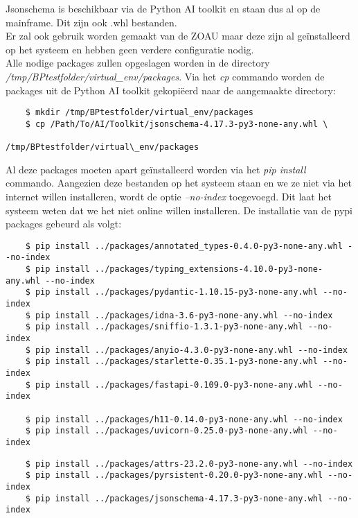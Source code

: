 Jsonschema is beschikbaar via de Python AI toolkit en staan dus al op de mainframe. Dit zijn ook .whl bestanden. \\

Er zal ook gebruik worden gemaakt van de ZOAU maar deze zijn al geïnstalleerd op het systeem en hebben geen verdere configuratie nodig. \\

Alle nodige packages zullen opgeslagen worden in de directory \textit{/tmp/BPtestfolder/virtual\_env/packages}. Via het \textit{cp} commando worden de packages uit de Python AI toolkit gekopiëerd naar de aangemaakte directory: \\

\begin{lstlisting}
    $ mkdir /tmp/BPtestfolder/virtual_env/packages
    $ cp /Path/To/AI/Toolkit/jsonschema-4.17.3-py3-none-any.whl \
                                         /tmp/BPtestfolder/virtual\_env/packages
\end{lstlisting} 

Al deze packages moeten apart geïnstalleerd worden via het \textit{pip install} commando. Aangezien deze bestanden op het systeem staan en we ze niet via het internet willen installeren, wordt de optie \textit{--no-index} toegevoegd. Dit laat het systeem weten dat we het niet online willen installeren. De installatie van de pypi packages gebeurd als volgt:\\
\begin{lstlisting}
    $ pip install ../packages/annotated_types-0.4.0-py3-none-any.whl --no-index
    $ pip install ../packages/typing_extensions-4.10.0-py3-none-any.whl --no-index
    $ pip install ../packages/pydantic-1.10.15-py3-none-any.whl --no-index
    $ pip install ../packages/idna-3.6-py3-none-any.whl --no-index
    $ pip install ../packages/sniffio-1.3.1-py3-none-any.whl --no-index
    $ pip install ../packages/anyio-4.3.0-py3-none-any.whl --no-index
    $ pip install ../packages/starlette-0.35.1-py3-none-any.whl --no-index
    $ pip install ../packages/fastapi-0.109.0-py3-none-any.whl --no-index
    
    $ pip install ../packages/h11-0.14.0-py3-none-any.whl --no-index
    $ pip install ../packages/uvicorn-0.25.0-py3-none-any.whl --no-index
\end{lstlisting}

\begin{lstlisting}
    $ pip install ../packages/attrs-23.2.0-py3-none-any.whl --no-index
    $ pip install ../packages/pyrsistent-0.20.0-py3-none-any.whl --no-index
    $ pip install ../packages/jsonschema-4.17.3-py3-none-any.whl --no-index
    
\end{lstlisting}

